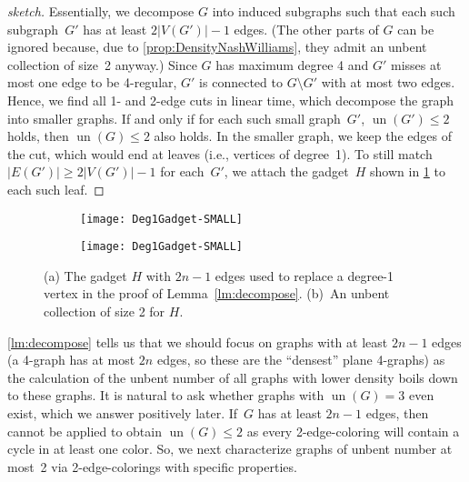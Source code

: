 \documentclass[runningheads]{llncs}
\newcommand{\un}{\operatorname{un}}
\begin{document}
\begin{proof}[sketch]
    Essentially, we decompose $G$ into induced subgraphs
    such that each such subgraph~$G'$ has at least $2|V(G')| - 1$ edges.
    (The other parts of $G$ can be ignored because, due to \cref{prop:DensityNashWilliams},
    they admit an unbent collection of size~2 anyway.)
    Since $G$ has maximum degree 4 and $G'$ misses at most one edge to be 4-regular, $G'$ is connected to $G \setminus G'$ with at most two edges.
    Hence, we find all 1- and 2-edge cuts in linear time,
    which decompose the graph into smaller graphs.
    If and only if for each such small graph~$G'$, $\un(G') \le 2$ holds,
    then $\un(G) \le 2$ also holds.
    In the smaller graph, we keep the edges of the cut,
    which would end at leaves (i.e., vertices of degree~1).
    To still match $|E(G')| \ge 2 |V(G')| - 1$ for each~$G'$,
    we attach the gadget~$H$ shown in \cref{fig:Deg1Gadget} to each such leaf.
\end{proof}

\begin{figure}[tb]
    \begin{subfigure}{.3\textwidth}
        \centering
        \texttt{[image: Deg1Gadget-SMALL]}
        \subcaption{}
    \end{subfigure}
    \hfill
    \begin{subfigure}{.65\textwidth}
        \centering
        \texttt{[image: Deg1Gadget-SMALL]}
        \subcaption{}
    \end{subfigure}
    \caption{(a) The gadget $H$ with $2n-1$ edges used to replace a degree-1 vertex %
    in the proof of Lemma~\ref{lm:decompose}.
    (b)~An unbent collection of size 2 for $H$.}
    \label{fig:Deg1Gadget}
\end{figure}

\cref{lm:decompose} tells us that we should focus on graphs with at least $2n-1$ edges
(a 4-graph has at most $2n$ edges, so these are the ``densest'' plane 4-graphs)
as the calculation of the unbent number of all graphs with lower density boils down to these graphs.
It is natural to ask whether graphs with $\un(G)=3$ even exist,
which we answer positively later.
If~$G$ has at least $2n-1$ edges,
then  cannot be applied to obtain $\un(G)\le 2$
as every 2-edge-coloring will contain a cycle in at least one color.
So, we next characterize graphs of unbent number at most~2 via  2-edge-colorings with specific properties.
\end{document}
